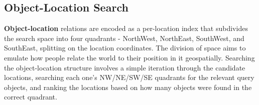 



\subsection{Object-Location Search}
\textbf{Object-location} relations are encoded as a per-location index that subdivides the search space into four quadrants - NorthWest, NorthEast, SouthWest, and SouthEast, splitting on the location coordinates. The division of space aims to emulate how people relate the world to their position in it geospatially. 
Searching the object-location structure involves a simple iteration through the candidate locations, searching each one's NW/NE/SW/SE quadrants for the relevant query objects, and ranking the locations based on how many objects were found in the correct quadrant.








